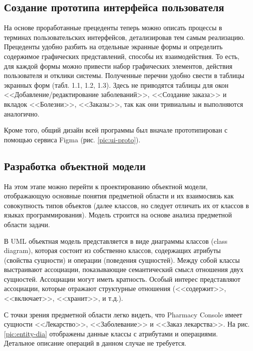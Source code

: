 \subsection{Создание прототипа интерфейса пользователя}

На основе проработанные прецеденты теперь можно описать процессы в терминах
пользовательских интерфейсов, детализировав тем самым реализацию. Прецеденты
удобно разбить на отдельные экранные формы и определить содержимое графических
представлений, способы их взаимодействия. То есть, для каждой формы можно
привести набор графических элементов, действия пользователя и отклики системы.
Полученные перечни удобно свести в таблицы экранных форм (табл. 1.1, 1.2, 1.3).
Здесь не приводятся таблицы для окон <<Добавление/редактирование заболеваний>>,
<<Создание заказа>> и вкладок <<Болезни>>, <<Заказы>>, так как они тривиальны и
выполняются аналогично.

Кроме того, общий дизайн всей программы был вначале прототипирован с помощью
сервиса Figma (рис. \ref{pic:ui-proto}).


\subsection{Разработка объектной модели}

На этом этапе можно перейти к проектированию объектной модели, отображающую
основные понятия предметной области и их взаимосвязь как совокупность типов
объектов (далее классов, но следует отличать их от классов в языках
программирования). Модель строится на основе анализа предметной области задачи.

В UML объектная модель представляется в виде диаграммы классов (class diagram),
которая состоит из собственно классов, содержащих атрибуты (свойства сущности)
и операции (поведения сущностей). Между собой классы выстраивают ассоциации,
показывающие семантический смысл отношения двух сущностей. Ассоциации могут иметь
кратность. Особый интерес представляют ассоциации, которые отражают структурные
отношения (<<содержит>>, <<включает>>, <<хранит>>, и т.д.).

С точки зрения предметной области легко видеть, что Pharmacy Console имеет
сущности <<Лекарство>>, <<Заболевание>> и <<Заказ лекарства>>. На рис.
\ref{pic:entity-dia} отображены данные классы с атрибутами и операциями.
Детальное описание операций в данном случае не требуется.


\begin{minipage}[t][6.5cm]{1\linewidth}
    
\end{minipage}


